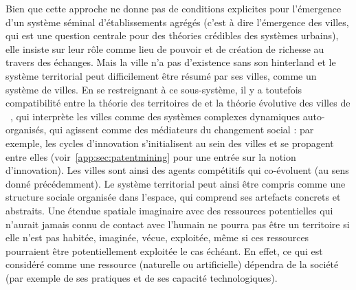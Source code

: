 {Bien que cette approche ne donne pas de conditions explicites pour l'émergence d'un système séminal d'établissements agrégés (c'est à dire l'émergence des villes, qui est une question centrale pour des théories crédibles des systèmes urbains), elle insiste sur leur rôle comme lieu de pouvoir et de création de richesse au travers des échanges. Mais la ville n'a pas d'existence sans son hinterland et le système territorial peut difficilement être résumé par ses villes, comme un système de villes. En se restreignant à ce sous-système, il y a toutefois compatibilité entre la théorie des territoires de  et la théorie évolutive des villes de ~\cite{pumain2010theorie}, qui interprète les villes comme des systèmes complexes dynamiques auto-organisés, qui agissent comme des médiateurs du changement social : par exemple, les cycles d'innovation s'initialisent au sein des villes et se propagent entre elles (voir~\ref{app:sec:patentmining} pour une entrée sur la notion d'innovation). Les villes sont ainsi des agents compétitifs qui co-évoluent (au sens donné précédemment). Le système territorial peut ainsi être compris comme une structure sociale organisée dans l'espace, qui comprend ses artefacts concrets et abstraits. Une étendue spatiale imaginaire avec des ressources potentielles qui n'aurait jamais connu de contact avec l'humain ne pourra pas être un territoire si elle n'est pas habitée, imaginée, vécue, exploitée, même si ces ressources pourraient être potentiellement exploitée le cas échéant. En effet, ce qui est considéré comme une ressource (naturelle ou artificielle) dépendra de la société (par exemple de ses pratiques et de ses capacité technologiques).
}








